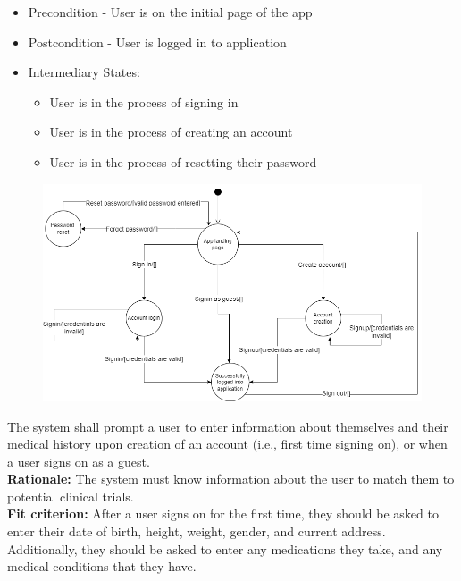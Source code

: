 \documentclass[12pt, titlepage]{article}
\newcounter{FR_Counter}
\begin{document}
\begin{itemize}
    \item Precondition - User is on the initial page of the app
    \item Postcondition - User is logged in to application
    \item Intermediary States:
    \begin{itemize}
        \item User is in the process of signing in
        \item User is in the process of creating an account
        \item User is in the process of resetting their password
    \end{itemize} 
\end{itemize}

\begin{figure}[H]
\includegraphics[width=\textwidth]{Signup_state_machine}
\end{figure}


The system shall prompt a user to enter information about themselves and their medical history 
upon creation of an account (i.e., first time signing on), or when a user signs on as a guest.\\
\textbf{Rationale:}
The system must know information about the user to match them to potential clinical trials.\\
\textbf{Fit criterion:}
After a user signs on for the first time, they should be asked to enter their date of birth, height, weight, gender, and 
current address. Additionally, they should be asked to enter any medications they take, and any medical conditions that they have.\\~\\
\addtocounter{FR_Counter}{1}
\end{document}
